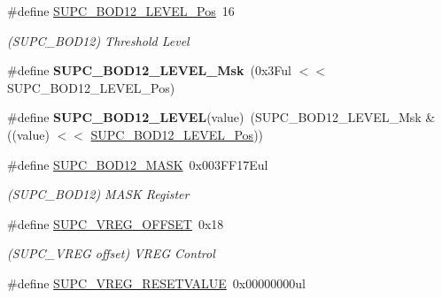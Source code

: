 \begin{DoxyCompactItemize}
\item 
\hypertarget{group___s_a_m_l21___s_u_p_c_ga00df9c3a8262531fd9f70fdbf2027f19}{}\#define \hyperlink{group___s_a_m_l21___s_u_p_c_ga00df9c3a8262531fd9f70fdbf2027f19}{S\+U\+P\+C\+\_\+\+B\+O\+D12\+\_\+\+L\+E\+V\+E\+L\+\_\+\+Pos}~16\label{group___s_a_m_l21___s_u_p_c_ga00df9c3a8262531fd9f70fdbf2027f19}

\begin{DoxyCompactList}\small\item\em (S\+U\+P\+C\+\_\+\+B\+O\+D12) Threshold Level \end{DoxyCompactList}\item 
\hypertarget{group___s_a_m_l21___s_u_p_c_ga899ac0ea0014dc1da3212cc59386ce5d}{}\#define {\bfseries S\+U\+P\+C\+\_\+\+B\+O\+D12\+\_\+\+L\+E\+V\+E\+L\+\_\+\+Msk}~(0x3\+Ful $<$$<$ S\+U\+P\+C\+\_\+\+B\+O\+D12\+\_\+\+L\+E\+V\+E\+L\+\_\+\+Pos)\label{group___s_a_m_l21___s_u_p_c_ga899ac0ea0014dc1da3212cc59386ce5d}

\item 
\hypertarget{group___s_a_m_l21___s_u_p_c_ga483d3e459fe147304b1bc04a72f71723}{}\#define {\bfseries S\+U\+P\+C\+\_\+\+B\+O\+D12\+\_\+\+L\+E\+V\+E\+L}(value)~(S\+U\+P\+C\+\_\+\+B\+O\+D12\+\_\+\+L\+E\+V\+E\+L\+\_\+\+Msk \& ((value) $<$$<$ \hyperlink{group___s_a_m_l21___s_u_p_c_ga00df9c3a8262531fd9f70fdbf2027f19}{S\+U\+P\+C\+\_\+\+B\+O\+D12\+\_\+\+L\+E\+V\+E\+L\+\_\+\+Pos}))\label{group___s_a_m_l21___s_u_p_c_ga483d3e459fe147304b1bc04a72f71723}

\item 
\hypertarget{group___s_a_m_l21___s_u_p_c_ga0bf64642ce9f6d661805f1bb5ef7b05f}{}\#define \hyperlink{group___s_a_m_l21___s_u_p_c_ga0bf64642ce9f6d661805f1bb5ef7b05f}{S\+U\+P\+C\+\_\+\+B\+O\+D12\+\_\+\+M\+A\+S\+K}~0x003\+F\+F17\+Eul\label{group___s_a_m_l21___s_u_p_c_ga0bf64642ce9f6d661805f1bb5ef7b05f}

\begin{DoxyCompactList}\small\item\em (S\+U\+P\+C\+\_\+\+B\+O\+D12) M\+A\+S\+K Register \end{DoxyCompactList}\item 
\hypertarget{group___s_a_m_l21___s_u_p_c_ga826e1de659bad9b908978ff4c16039e2}{}\#define \hyperlink{group___s_a_m_l21___s_u_p_c_ga826e1de659bad9b908978ff4c16039e2}{S\+U\+P\+C\+\_\+\+V\+R\+E\+G\+\_\+\+O\+F\+F\+S\+E\+T}~0x18\label{group___s_a_m_l21___s_u_p_c_ga826e1de659bad9b908978ff4c16039e2}

\begin{DoxyCompactList}\small\item\em (S\+U\+P\+C\+\_\+\+V\+R\+E\+G offset) V\+R\+E\+G Control \end{DoxyCompactList}\item 
\hypertarget{group___s_a_m_l21___s_u_p_c_ga34bef1f4485a43ee14e1f35872176644}{}\#define \hyperlink{group___s_a_m_l21___s_u_p_c_ga34bef1f4485a43ee14e1f35872176644}{S\+U\+P\+C\+\_\+\+V\+R\+E\+G\+\_\+\+R\+E\+S\+E\+T\+V\+A\+L\+U\+E}~0x00000000ul\label{group___s_a_m_l21___s_u_p_c_ga34bef1f4485a43ee14e1f35872176644}


\end{DoxyCompactItemize}
